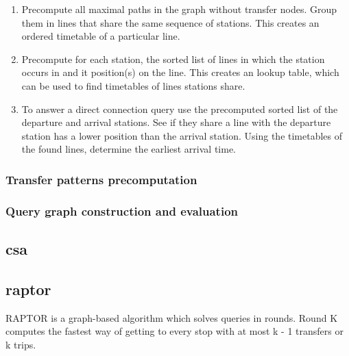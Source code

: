 \begin{enumerate}
    \item Precompute all maximal paths in the graph without transfer nodes. Group them in lines that share the same sequence of stations. This creates an ordered timetable of a particular line.
    \item Precompute for each station,  the sorted list of lines in which the station occurs in and it position(s) on the line. This creates an lookup table, which can be used to find timetables of lines stations share.
    \item To answer a direct connection query use the precomputed sorted list of the departure and arrival stations. See if they share a line with the departure station has a lower position than the arrival station. Using the timetables of the found lines, determine the earliest arrival time.
\end{enumerate}
\subsubsection{Transfer patterns precomputation}
\subsubsection{Query graph construction and evaluation}

\subsection{\acrfull{csa}}
\subsection{\acrfull{raptor}}
RAPTOR is a graph-based algorithm which solves queries in rounds. Round K computes the fastest way of getting to every stop with at most k - 1 transfers or k trips.

